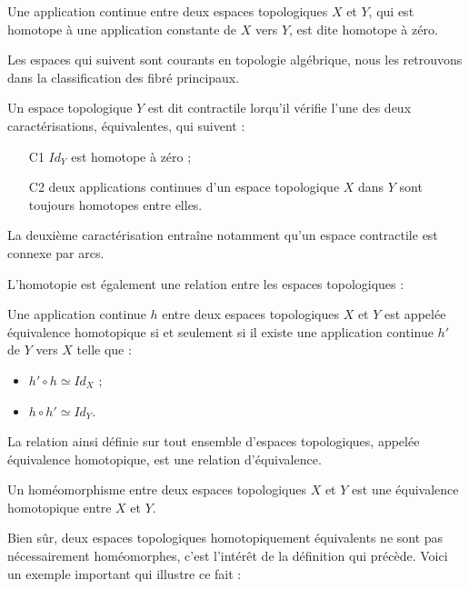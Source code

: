 \begin{defi}
Une application continue entre deux espaces topologiques $X$ et $Y$, qui est homotope \`a une application constante de $X$ vers $Y$, %
est dite homotope \`a z\'ero.
\end{defi}

Les espaces qui suivent sont courants en topologie alg\'ebrique, nous les retrouvons dans la classification des fibr\'e principaux.

\begin{prefi}
Un espace topologique $Y$ est dit contractile lorqu'il v\'erifie l'une des deux caract\'erisations, \'equivalentes, qui suivent :
\begin{enumerate}[label=(C\arabic *)]
\item[C1] $Id_Y$ est homotope \`a z\'ero ;
\item[C2] deux applications continues d'un espace topologique $X$ dans $Y$ sont toujours homotopes entre elles.
\end{enumerate}
\end{prefi}

La deuxi\`eme caract\'erisation entra\^ine notamment qu'un espace contractile est connexe par arcs.

\par
L'homotopie est \'egalement une relation entre les espaces topologiques :

\begin{defi}
Une application continue $h$ entre deux espaces topologiques $X$ et $Y$ est appel\'ee \'equivalence homotopique si et seulement si %
il existe une application continue $h'$ de $Y$ vers $X$ telle que :
\begin{itemize}
\item $h'\circ h\simeq Id_X$ ;
\item $h\circ h'\simeq Id_Y$.
\end{itemize}
La relation ainsi d\'efinie sur tout ensemble d'espaces topologiques, appel\'ee \'equivalence homotopique, est une relation d'\'equivalence.
\end{defi}

\begin{exem}
Un hom\'eomorphisme entre deux espaces topologiques $X$ et $Y$ est une \'equivalence homotopique entre $X$ et $Y$.
\end{exem}

Bien s\^ur, deux espaces topologiques homotopiquement \'equivalents ne sont pas n\'ecessairement hom\'eomorphes, c'est l'int\'er\^et de la d\'efinition qui pr\'ec\`ede. %
Voici un exemple important qui illustre ce fait :

